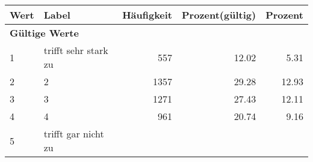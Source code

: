      \begin{longtable}{lXrrr}
     \toprule
     \textbf{Wert} & \textbf{Label} & \textbf{Häufigkeit} & \textbf{Prozent(gültig)} & \textbf{Prozent} \\
     \endhead
     \midrule
     \multicolumn{5}{l}{\textbf{Gültige Werte}}\\

     1 &
     \multicolumn{1}{X}{ trifft sehr stark zu   } &


       \num{557} &
       \num[round-mode=places,round-precision=2]{12,02} &
         \num[round-mode=places,round-precision=2]{5,31} \\

     2 &
     \multicolumn{1}{X}{ 2   } &


       \num{1357} &
       \num[round-mode=places,round-precision=2]{29,28} &
         \num[round-mode=places,round-precision=2]{12,93} \\

     3 &
     \multicolumn{1}{X}{ 3   } &


       \num{1271} &
       \num[round-mode=places,round-precision=2]{27,43} &
         \num[round-mode=places,round-precision=2]{12,11} \\

     4 &
     \multicolumn{1}{X}{ 4   } &


       \num{961} &
       \num[round-mode=places,round-precision=2]{20,74} &
         \num[round-mode=places,round-precision=2]{9,16} \\

     5 &
     \multicolumn{1}{X}{ trifft gar nicht zu   } &



\end{longtable}
